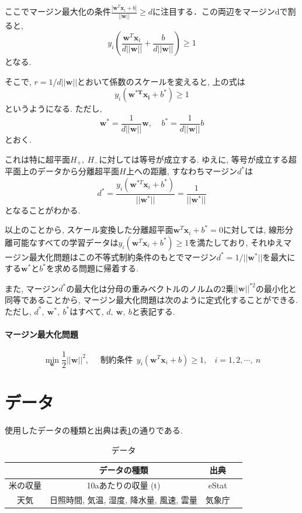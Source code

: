 \documentclass{jarticle}
\begin{document}
 ここでマージン最大化の条件$\frac{|\bm{w}^T\bm{x}_i + b|}{||\bm{w}||}\geq d$に注目する．この両辺をマージンdで割ると, 
 \[y_i\left(\frac{\bm{w}^T\bm{x}_i}{d||\bm{w}||}+\frac{b}{d||\bm{w}||}\right)\geq 1\]
となる.
 
 
そこで, $r=1/d||\bm{w}||$とおいて係数のスケールを変えると, 上の式は
\[y_i(\bm{w}^{*\bm{T}}\bm{x_i}+b^*)\geq 1\]
というようになる.
ただし, 
\[\bm{w}^* = \frac{1}{d||\bm{w}||}\bm{w},\ \ \ \ \  b^* = \frac{1}{d||\bm{w}||}b\]
とおく.

 これは特に超平面$H_+,\ H_-$に対しては等号が成立する.
ゆえに, 等号が成立する超平面上のデータから分離超平面$H$上への距離, すなわちマージン$d^*$は
\[d^*=\frac{y_i(\bm{w}^{*T}\bm{x}_i+b^*)}{||\bm{w^*}||}=\frac{1}{||\bm{w}^*||}\]
となることがわかる.


以上のことから, スケール変換した分離超平面$\bm{w}^T\bm{x}_i+b^*=0$に対しては, 線形分離可能なすべての学習データは$y_i(\bm{w}^T\bm{x}_i+b^*)\geq 1$を満たしており, それゆえマージン最大化問題はこの不等式制約条件のもとでマージン$d^*=1/||\bm{w}^*||$を最大にする$\bm{w}^*$と$b^*$を求める問題に帰着する.

 また, マージン$d^*$の最大化は分母の重みベクトルのノルムの2乗$||\bm{w}||^{*2}$の最小化と同等であることから, マージン最大化問題は次のように定式化することができる.
ただし, $d^*,\ \bm{w}^*,\ b^*$はすべて, $d,\ \bm{w},\ b$と表記する.

\paragraph{マージン最大化問題}

\[\min_{\bm{w}}\frac{1}{2}||\bm{w}||^2,\ \ \ \ \ \ \mbox{制約条件}\ \ y_i(\bm{w}^{T}\bm{x}_i+b)\geq 1,\ \ \ \  i=1,2,\cdots,\ n\]




 
\hypertarget{header-n2013}{%
\section{データ}\label{header-n2013}}
使用したデータの種類と出典は表\ref{data}の通りである.

\begin{table}[H]
\caption{データ}
\begin{tabular}{|c|c|c|c|} \hline
&データの種類&出典\\ \hline
米の収量&10aあたりの収量 (t)&eStat\\ \hline
天気&日照時間, 気温, 湿度, 降水量, 風速, 雲量&気象庁\\ \hline
\end{tabular}
\centering
\label{data}
\end{table}
\end{document}
